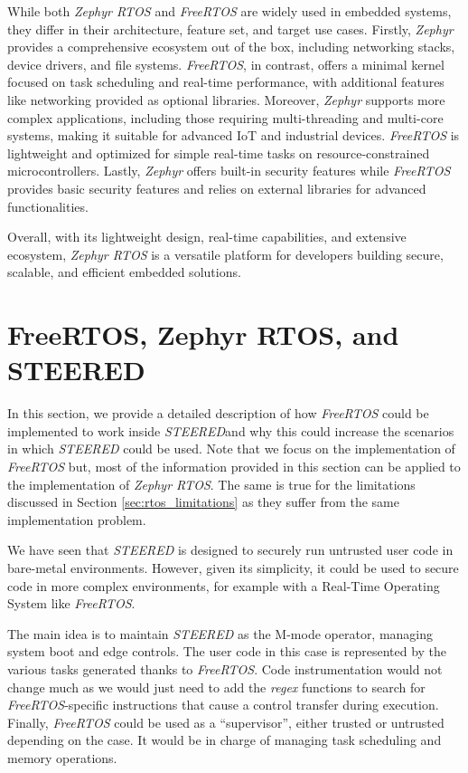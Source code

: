 While both \textit{Zephyr RTOS} and \textit{FreeRTOS} are widely used in embedded
systems, they differ in their architecture, feature set, and target use cases. Firstly,
\textit{Zephyr} provides a comprehensive ecosystem out of the box, including
networking stacks, device drivers, and file systems. \textit{FreeRTOS}, in contrast,
offers a minimal kernel focused on task scheduling and real-time performance, with
additional features like networking provided as optional libraries. Moreover, \textit{Zephyr}
supports more complex applications, including those requiring multi-threading and
multi-core systems, making it suitable for advanced IoT and industrial devices. \textit{FreeRTOS}
is lightweight and optimized for simple real-time tasks on resource-constrained
microcontrollers. Lastly, \textit{Zephyr} offers built-in security features while
\textit{FreeRTOS} provides basic security features and relies on external
libraries for advanced functionalities.

Overall, with its lightweight design, real-time capabilities, and extensive ecosystem,
\textit{Zephyr RTOS} is a versatile platform for developers building secure,
scalable, and efficient embedded solutions.

\section{FreeRTOS, Zephyr RTOS, and STEERED}
\label{sec:rtos_porting}

In this section, we provide a detailed description of how \textit{FreeRTOS}
could be implemented to work inside \textit{STEERED}and why this could increase
the scenarios in which \textit{STEERED} could be used. Note that we focus on the
implementation of \textit{FreeRTOS} but, most of the information provided in
this section can be applied to the implementation of \textit{Zephyr RTOS}. The
same is true for the limitations discussed in Section \ref{sec:rtos_limitations}
as they suffer from the same implementation problem.

We have seen that \textit{STEERED} is designed to securely run untrusted user code
in bare-metal environments. However, given its simplicity, it could be used to
secure code in more complex environments, for example with a Real-Time Operating
System like \textit{FreeRTOS}.

The main idea is to maintain \textit{STEERED} as the M-mode operator, managing
system boot and edge controls. The user code in this case is represented by the various
tasks generated thanks to \textit{FreeRTOS}. Code instrumentation would not change
much as we would just need to add the \textit{regex} functions to search for
\textit{FreeRTOS}-specific instructions that cause a control transfer during execution.
Finally, \textit{FreeRTOS} could be used as a ``supervisor'', either trusted or untrusted
depending on the case. It would be in charge of managing task scheduling and
memory operations.


